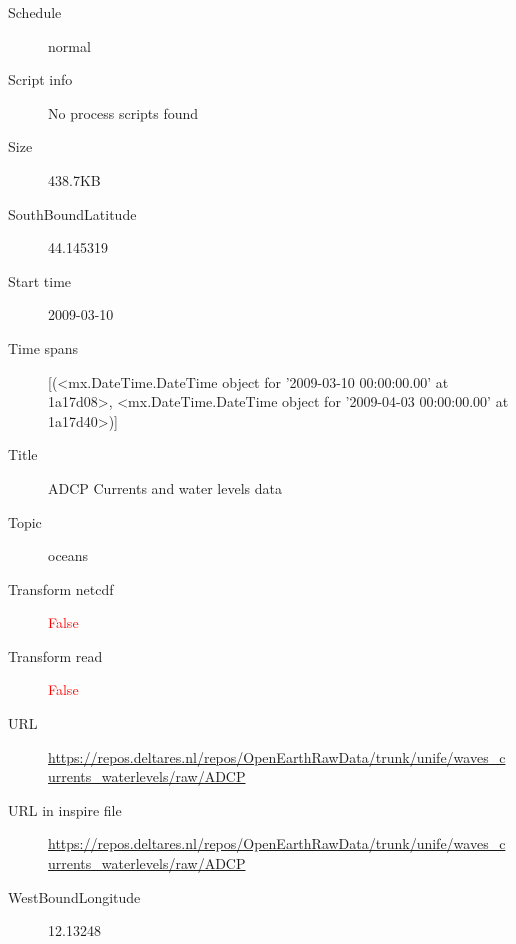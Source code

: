 \documentclass[9]{report}
\begin{document}
\begin{description}
\begin{verbatim}
\end{verbatim}
  \item[Schedule] normal
  \item[Script info] No process scripts found
  \item[Size] 438.7KB
  \item[SouthBoundLatitude] 44.145319
  \item[Start time] 2009-03-10
  \item[Time spans] [(<mx.DateTime.DateTime object for '2009-03-10 00:00:00.00' at 1a17d08>, <mx.DateTime.DateTime object for '2009-04-03 00:00:00.00' at 1a17d40>)]
  \item[Title]  ADCP Currents and water levels data 
  \item[Topic] oceans
  \item[Transform netcdf] \textcolor{red}{False}
  \item[Transform read] \textcolor{red}{False}
  \item[URL] \href{https://repos.deltares.nl/repos/OpenEarthRawData/trunk/unife/waves\_currents\_waterlevels/raw/ADCP}{https://repos.deltares.nl/repos/OpenEarthRawData/trunk/unife/waves\_currents\_waterlevels/raw/ADCP}
  \item[URL in inspire file] \href{https://repos.deltares.nl/repos/OpenEarthRawData/trunk/unife/waves\_currents\_waterlevels/raw/ADCP}{https://repos.deltares.nl/repos/OpenEarthRawData/trunk/unife/waves\_currents\_waterlevels/raw/ADCP}
  \item[WestBoundLongitude] 12.13248
\end{description}
\end{document}
